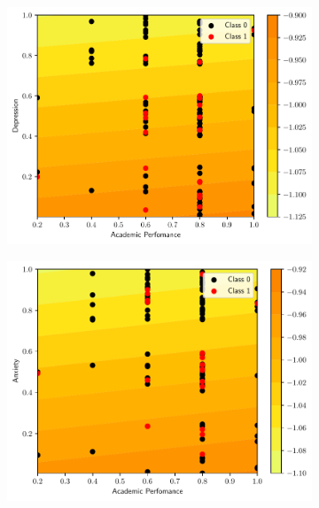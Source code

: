 \begin{figure}
  \begin{subfigure}[b]{0.32\textwidth}
    \centering
    \includegraphics[width=\textwidth]{figs/svm-linear-contour-1-3.pdf}
    \caption{}
    \label{fig:SVM-linear2a}
  \end{subfigure}
  \begin{subfigure}[b]{0.32\textwidth}
    \centering
    \includegraphics[width=\textwidth]{figs/svm-linear-contour-1-4.pdf}
    \caption{}
  \end{subfigure}
  \begin{subfigure}[b]{0.32\textwidth}
    \centering

\end{subfigure}
\end{figure}
